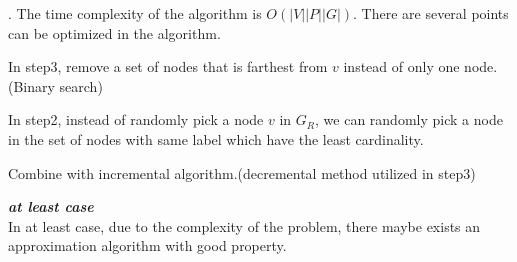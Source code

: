 .  The time complexity of the algorithm is $O(|V||P||G|)$. There are several points can be optimized in the algorithm.
\be
\item [(1)] In step3, remove a set of nodes that is farthest from $v$ instead of only one node.(Binary search)
\item [(2)] In step2, instead of randomly pick a node $v$ in $G_R$, we can randomly pick a node in the set of nodes with same label which have the least cardinality.
\item [(2)] Combine with incremental algorithm.(decremental method utilized in step3)
\ee

\textbf{\emph{at least case}}\\
In at least case, due to the complexity of the problem, there maybe exists an approximation algorithm with good property.
